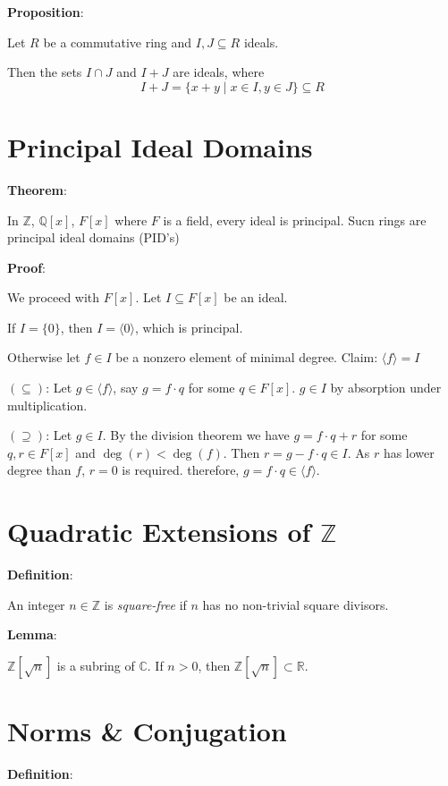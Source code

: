 \documentclass{article}
\begin{document}
\begin{multicols*}{2}
\textbf{Proposition}:

Let $R$ be a commutative ring and $I, J \subseteq R$ ideals.

Then the sets $I \cap J$ and $I + J$ are ideals, where \[I + J = \{ x + y \;|\; x\in I, y\in J\} \subseteq R\]

\section{Principal Ideal Domains}

\textbf{Theorem}:

In $\mathbb{Z}$, $\mathbb{Q}[x]$, $F[x]$ where $F$ is a field, every ideal is principal. Sucn rings are principal ideal domains (PID's)

\textbf{Proof}:

We proceed with $F[x]$. Let $I \subseteq F[x]$ be an ideal.

If $I = \{0\}$, then $I = \langle 0\rangle$, which is principal.

Otherwise let $f \in I$ be a nonzero element of minimal degree. Claim: $\langle f\rangle = I$

$(\subseteq)$: Let $g \in \langle f \rangle$, say $g = f \cdot q$ for some $q \in F[x]$. $g \in I$ by absorption under multiplication.

$(\supseteq)$: Let $g \in I$. By the division theorem we have $g = f \cdot q + r$ for some $q, r \in F[x]$ and $\deg(r) < \deg(f)$. Then $r = g - f \cdot q \in I$. As $r$ has lower degree than $f$, $r = 0$ is required. therefore, $g = f \cdot q \in \langle f\rangle$.


\section{Quadratic Extensions of $\mathbb{Z}$}

\textbf{Definition}:

An integer $n \in \mathbb{Z}$ is \textit{square-free} if $n$ has no non-trivial square divisors.

\textbf{Lemma}:

$\mathbb{Z}[\sqrt{n}]$ is a subring of $\mathbb{C}$. If $n > 0$, then $\mathbb{Z}[\sqrt{n}] \subset \mathbb{R}$.

\section{Norms \& Conjugation}

\textbf{Definition}:


\end{multicols*}
\end{document}
